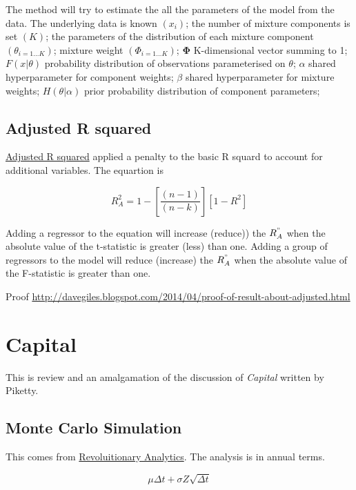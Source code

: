 \documentclass[12pt, a4paper, oneside]{article}\usepackage[]{graphicx}\usepackage[]{color}
\begin{document}
The method will try to estimate the all the parameters of the model from the data.  The underlying data is known $(x_i)$; the number of mixture components is set $(K)$; the parameters of the distribution of each mixture component $(\theta_{i=1\dots K})$; mixture weight $(\Phi_{i = 1\dots K})$; $\mathbf{\Phi}$ K-dimensional vector summing to 1; $F(x|\theta)$ probability distribution of observations parameterised on $\theta$; $\alpha$ shared hyperparameter for component weights; $\beta$ shared hyperparameter for mixture weights; $H(\theta|\alpha)$ prior probability distribution of component parameters; 

\subsection{Adjusted R squared}
\href{http://davegiles.blogspot.ca/2013/05/when-will-adjusted-r-squared-increase.html}{Adjusted R squared} applied a penalty to the basic R squard to account for additional variables.  The equartion is 

\begin{equation}
R_A^2 = 1 - \left [ \frac{(n-1)}{(n-k)} \right ] [1 - R^2]
\end{equation}

Adding a regressor to the equation will increase (reduce)) the $R_A^"$ when the absolute value of the t-statistic is greater (less) than one. Adding a group of regressors to the model will reduce (increase) the $R_A^"$ when the absolute value of the F-statistic is greater than one.  

Proof \href{http://davegiles.blogspot.com/2014/04/proof-of-result-about-adjusted.html}{http://davegiles.blogspot.com/2014/04/proof-of-result-about-adjusted.html}


\section{Capital}
This is  review and an amalgamation of the discussion of \emph{Capital} written by Piketty.  

\subsection{Monte Carlo Simulation}
This comes from \href{http://blog.revolutionanalytics.com/2014/04/quantitative-finance-applications-in-r-5.html}{Revoluitionary Analytics}.  The analysis is in annual terms.  

\begin{equation}
\mu \Delta t + \sigma Z \sqrt{\Delta t}
\end{equation}
\end{document}

